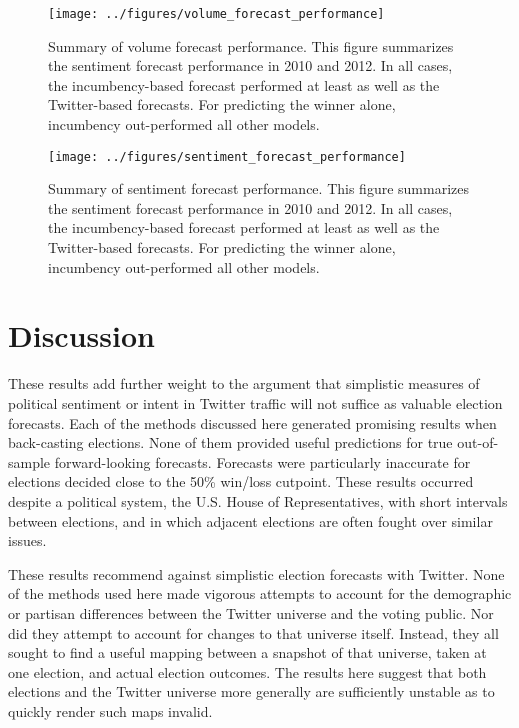 \documentclass{sig-alternate-2013}
\begin{document}


\begin{figure}
  \centering
  \texttt{[image: ../figures/volume\_forecast\_performance]}
  \caption{Summary of volume forecast performance. This figure summarizes the sentiment forecast performance in 2010 and 2012. In all cases, the incumbency-based forecast performed at least as well as the Twitter-based forecasts. For predicting the winner alone, incumbency out-performed all other models. }
  \label{fig:lm_volume_model_graph}
\end{figure}
\begin{figure}
  \centering
  \texttt{[image: ../figures/sentiment\_forecast\_performance]}
  \caption{Summary of sentiment forecast performance. This figure summarizes the sentiment forecast performance in 2010 and 2012. In all cases, the incumbency-based forecast performed at least as well as the Twitter-based forecasts. For predicting the winner alone, incumbency out-performed all other models. }
  \label{fig:lm_sentiment_model_graph}
\end{figure}
%


\section{Discussion}
\label{sec:discussion}

These results add further weight to the argument that simplistic
measures of political sentiment or intent in Twitter traffic will not
suffice as valuable election forecasts. Each of the methods discussed
here generated promising results when back-casting elections. None of
them provided useful predictions for true out-of-sample
forward-looking forecasts. Forecasts were particularly inaccurate for
elections decided close to the 50\% win/loss cutpoint. These results
occurred despite a political system, the U.S. House of
Representatives, with short intervals between elections, and in which
adjacent elections are often fought over similar issues.

These results recommend against simplistic
election forecasts with Twitter. None of the methods used here made
vigorous attempts to account for the demographic or partisan
differences between the Twitter universe and the voting public. Nor
did they attempt to account for changes to that universe
itself. Instead, they all sought to find a useful mapping between a
snapshot of that universe, taken at one election, and actual election
outcomes. The results here suggest that both elections and the Twitter
universe more generally are sufficiently unstable as to quickly render
such maps invalid. 
\end{document}
